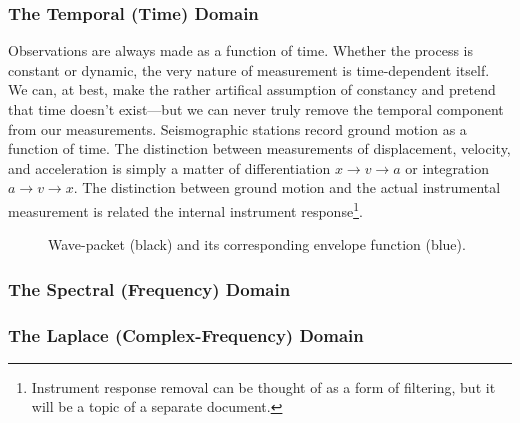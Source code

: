 \documentclass[american, twoside]{article}
\begin{document}
\subsubsection{The Temporal (Time) Domain} \label{Background:Math:Temporal}
Observations are always made as a function of time. Whether the process is constant or dynamic, the very nature of measurement is time-dependent itself. We can, at best, make the
rather artifical assumption of constancy and pretend that time doesn't exist---but we can never truly remove the temporal component from our measurements. Seismographic stations
record ground motion as a function of time. The distinction between measurements of displacement, velocity, and acceleration is simply a matter of differentiation $x\rightarrow v\rightarrow a$
or integration $a\rightarrow v \rightarrow x$. The distinction between ground motion and the actual instrumental measurement is related the internal instrument response\footnote{Instrument
response removal can be thought of as a form of filtering, but it will be a topic of a separate document.}.

\begin{center}
\begin{figure}
\label{figure:1}
\caption{Wave-packet (black) and its corresponding envelope function (blue).}
\end{figure}
\end{center}

\subsubsection{The Spectral (Frequency) Domain} \label{Background:Math:Spectral}

\subsubsection{The Laplace (Complex-Frequency) Domain} \label{Background:Math:Laplace}
\end{document}
